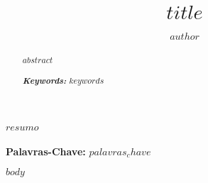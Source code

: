 \documentclass[12pt,final]{article} %
\title{$title$}
\author{$author$}
\providecommand{\keywords}[1]
{
    \textbf{\\\textit{ Keywords: }} #1
}
\providecommand{\PalavrasChaves}[1]
{
  \textbf{\\Palavras-Chave: } #1
}
\begin{document}
 

\maketitle

\begin{abstract}
  $abstract$
  \\ \keywords{$keywords$}
\end{abstract}
     
\begin{resumo} 
  $resumo$
  \\ \PalavrasChaves{$palavras_chave$}
\end{resumo}

$body$



\end{document}
